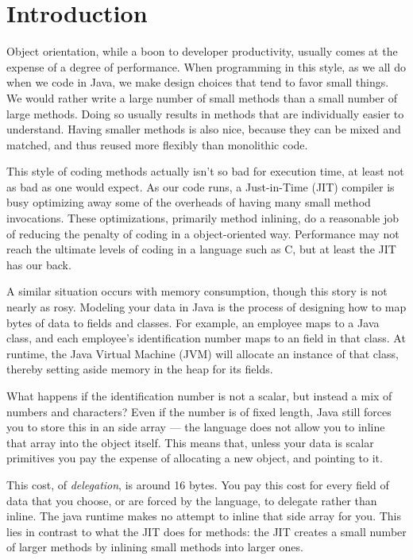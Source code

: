 
\chapter{Introduction}
\label{chapter:introduction}

Object orientation, while a boon to developer productivity, usually comes at the
expense of a degree of performance. When programming in this style, as we all do
when we code in Java, we make design choices that tend to favor small things.
We would rather write a large number of small methods than a small number of
large methods. Doing so usually results in methods that are individually easier
to understand. Having smaller methods is also nice, because they can be mixed
and matched, and thus reused more flexibly than monolithic code.

This style of coding methods actually isn't so bad for execution time, at least
not as bad as one would expect. As our code runs, a Just-in-Time (JIT) compiler
is busy optimizing away some of the overheads of having many small method
invocations. These optimizations, primarily method inlining, do a reasonable job
of reducing the penalty of coding in a object-oriented way. Performance may not
reach the ultimate levels of coding in a language such as C, but at least the
JIT has our back.

A similar situation occurs with memory consumption, though this story is not
nearly as rosy.
Modeling your data in Java is the process of designing how to map bytes of data
to fields and classes.
For example, an employee maps to a  Java class, and each
employee's identification number maps to an  field in that class. At
runtime, the Java Virtual Machine (JVM) will allocate an instance of that class,
thereby setting aside memory in the heap for its fields.

What happens if the identification number is not a scalar, but instead a mix of
numbers and characters? Even if the number is of fixed length, Java still forces
you to store this in an side array --- the language does not allow you to inline
that array into the  object itself. This means that, unless
your data is scalar primitives you pay the expense of allocating a new object,
and pointing to it. 

This cost, of \emph{delegation}, is around 16 bytes. You pay this cost for every
field of data that you choose, or are forced by the language, to delegate rather
than inline. The java runtime makes no attempt to inline that side array
for you. This lies in contrast to what the JIT does for methods: the JIT creates a
small number of larger methods by inlining small methods into larger ones.

